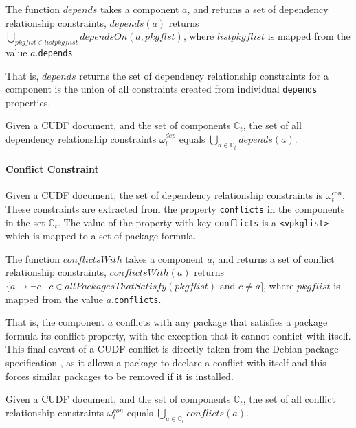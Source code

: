 \begin{defs}
The function $depends$ takes a component $a$, and returns a set of dependency relationship constraints,
$depends(a)$ returns $\bigcup \limits_{pkgflst \in listpkgflist} dependsOn(a,pkgflst)$, where $listpkgflist$ is mapped from the value $a$.\texttt{depends}.
\end{defs}
That is, $depends$ returns the set of dependency relationship constraints for a component is the union of all constraints created from individual \verb+depends+ properties.

\begin{defs}
Given a CUDF document, and the set of components $\mathbb{C}_t$,
the set of all dependency relationship constraints $\omega_t^{dep}$ equals $\bigcup \limits_{a \in \mathbb{C}_t} depends(a)$.
\end{defs}

\paragraph{Conflict Constraint}
Given a CUDF document, the set of dependency relationship constraints is $\omega_t^{con}$.
These constraints are extracted from the property \texttt{conflicts} in the components in the set $\mathbb{C}_t$.
The value of the property with key \texttt{conflicts} is a \texttt{<vpkglist>} which is mapped to a set of package formula.

\begin{defs}
The function $conflictsWith$ takes a component $a$, and returns a set of conflict relationship constraints,
$conflictsWith(a)$ returns $\{a \rightarrow \neg c \mid c \in allPackagesThatSatisfy(pkgflist) \mbox { and } c \not = a]$, where $pkgflist$ is mapped from the value $a$.\texttt{conflicts}.
\end{defs}
That is, the component $a$ conflicts with any package that satisfies a package formula its conflict property,
with the exception that it cannot conflict with itself.
This final caveat of a CUDF conflict is directly taken from the Debian package specification \citep{Barth2005}, 
as it allows a package to declare a conflict with itself and this forces similar packages to be removed if it is installed.  

\begin{defs}
Given a CUDF document, and the set of components $\mathbb{C}_t$,
the set of all conflict relationship constraints $\omega_t^{con}$ equals $\bigcup \limits_{a\in \mathbb{C}_t} conflicts(a)$.
\end{defs} 

